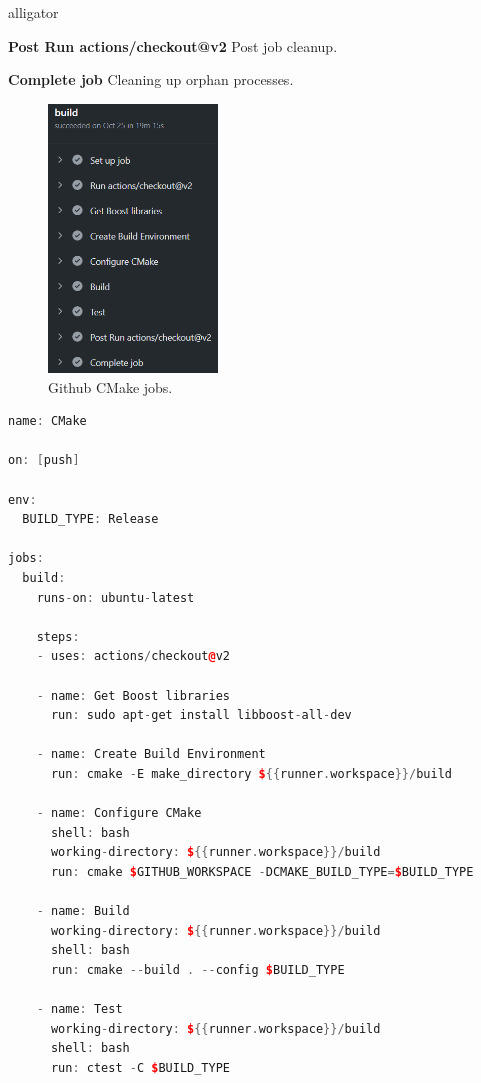 \documentclass[a4paper,12pt]{book}
\begin{document}
{\begin{labeling}{alligator}
\item [\textbf{Post Run actions/checkout@v2}] Post job cleanup.

\item [\textbf{Complete job}] Cleaning up orphan processes.
\end{labeling} 
    
\begin{figure}[H]
  \centering
    \includegraphics[width=0.4\textwidth]{jobs}
    \caption{Github CMake jobs.}
\end{figure}  

\begin{lstlisting}[frame=single, basicstyle=\small, language=C++, caption={cmake.yaml docker image used in project to set up automation server.}, captionpos=b, float]
name: CMake

on: [push]

env:
  BUILD_TYPE: Release

jobs:
  build:
    runs-on: ubuntu-latest

    steps:
    - uses: actions/checkout@v2
      
    - name: Get Boost libraries
      run: sudo apt-get install libboost-all-dev
      
    - name: Create Build Environment
      run: cmake -E make_directory ${{runner.workspace}}/build

    - name: Configure CMake
      shell: bash
      working-directory: ${{runner.workspace}}/build
      run: cmake $GITHUB_WORKSPACE -DCMAKE_BUILD_TYPE=$BUILD_TYPE

    - name: Build
      working-directory: ${{runner.workspace}}/build
      shell: bash
      run: cmake --build . --config $BUILD_TYPE

    - name: Test
      working-directory: ${{runner.workspace}}/build
      shell: bash
      run: ctest -C $BUILD_TYPE
\end{lstlisting}
}
\end{document}
